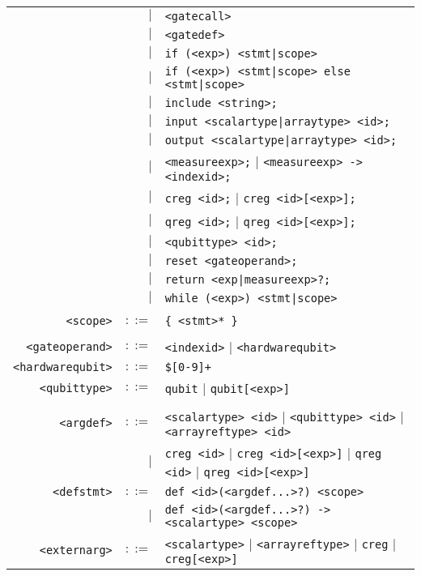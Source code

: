 \documentclass[notitlepage]{article}
\begin{document}
\begin{longtable}{rrl}
	    & $\mid$ & \texttt{<gatecall>} \\
	    & $\mid$ & \texttt{<gatedef>} \\
	    & $\mid$ & \texttt{if (<exp>) <stmt|scope>} \\
	    & $\mid$ & \texttt{if (<exp>) <stmt|scope> else <stmt|scope>} \\
	    & $\mid$ & \texttt{include <string>;} \\
	    & $\mid$ & \texttt{input <scalartype|arraytype> <id>;} \\
	    & $\mid$ & \texttt{output <scalartype|arraytype> <id>;} \\
	    & $\mid$ & \texttt{<measureexp>;} $\mid$ \texttt{<measureexp> -> <indexid>;} \\
	    & $\mid$ & \texttt{creg <id>;} $\mid$ \texttt{creg <id>[<exp>];} \\
	    & $\mid$ & \texttt{qreg <id>;} $\mid$ \texttt{qreg <id>[<exp>];} \\
	    & $\mid$ & \texttt{<qubittype> <id>;} \\
	    & $\mid$ & \texttt{reset <gateoperand>;} \\
	    & $\mid$ & \texttt{return <exp|measureexp>?;} \\
	    & $\mid$ & \texttt{while (<exp>) <stmt|scope>} \\ \\
    \texttt{<scope>} & $::=$ & \texttt{\{ <stmt>* \}} \\ \\
    \texttt{<gateoperand>} & $::=$ & \texttt{<indexid>} $\mid$ \texttt{<hardwarequbit>} \\
    \texttt{<hardwarequbit>} & $::=$ & \texttt{\$[0-9]+} \\
    \texttt{<qubittype>} & $::=$ & \texttt{qubit} $\mid$ \texttt{qubit[<exp>]} \\ \\
    \texttt{<argdef>} & $::=$ & \texttt{<scalartype> <id>} $\mid$ \texttt{<qubittype> <id>} $\mid$ \texttt{<arrayreftype> <id>} \\
        & $\mid$ & \texttt{creg <id>} $\mid$ \texttt{creg <id>[<exp>]} $\mid$ \texttt{qreg <id>} $\mid$ \texttt{qreg <id>[<exp>]} \\
    \texttt{<defstmt>} & $::=$ & \texttt{def <id>(<argdef...>?) <scope>} \\
	    & $\mid$ & \texttt{def <id>(<argdef...>?) -> <scalartype> <scope>} \\
	\texttt{<externarg>} & $::=$ & \texttt{<scalartype>} $\mid$ \texttt{<arrayreftype>} $\mid$ \texttt{creg} $\mid$ \texttt{creg[<exp>]} \\

\end{longtable}
\end{document}
